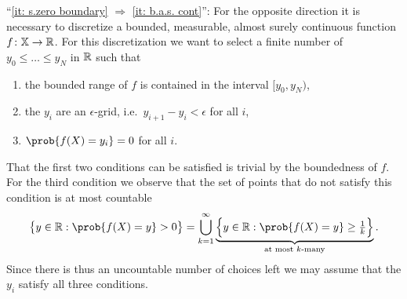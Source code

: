 \begin{myproof}
    ``\ref{it: s.zero boundary} \(\Rightarrow\) \ref{it: b.a.s. cont}'': For the
    opposite direction it is necessary to discretize a bounded, measurable,
    almost surely continuous function \(f\colon \mathbb{X} \to \mathbb{R}\). For this discretization we want to
    select a finite number of \(y_0 \le \ldots \le y_N\) in \(\mathbb{R}\)
    such that 
    \begin{enumerate}[noitemsep]
        \item the bounded range of \(f\) is contained in the interval \([y_0, y_N)\),
        \item the \(y_i\) are an \(\epsilon\)-grid, i.e.\ \(y_{i+1} - y_i < \epsilon\) for all \(i\),
        \item \(\prob{f(X) = y_i} = 0\) for all \(i\).
    \end{enumerate}
    That the first two conditions can be satisfied is trivial by the boundedness of \(f\). For
    the third condition we observe that the set of points that do not
    satisfy this condition is at most countable
    \[
        \set[\big]{y \in \real : \prob{f(X) = y} > 0}
        = \bigcup_{k=1}^\infty \underbrace{\set[\Big]{y \in \real : \prob{f(X) = y} \ge \tfrac1k}}_{\text{at most \(k\)-many}}.
    \]
    Since there is thus an uncountable number of choices left we may assume that
    the \(y_i\) satisfy all three conditions.


\end{myproof}
